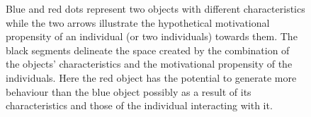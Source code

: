 \begin{figure}[h]
\begin{center}
\begin{adjustbox}{width=0.5\columnwidth}
\begin{tikzpicture}[x=0.75pt,y=0.75pt,yscale=-1,xscale=1]
            
            
            
            \end{tikzpicture}
    \end{adjustbox}
  \end{center}
\caption[\textbf{Motivation as a vector}]{Blue and red dots represent two objects with different characteristics while the two arrows illustrate the hypothetical motivational propensity of an individual (or two individuals) towards them. The black segments delineate the space created by the combination of the objects' characteristics and the motivational propensity of the individuals. Here the red object has the potential to generate more behaviour than the blue object possibly as a result of its characteristics and those of the individual interacting with it.}
\label{fig: vect_mot}
\end{figure}